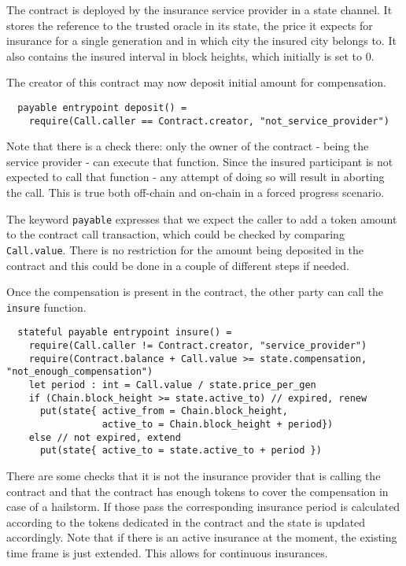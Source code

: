The contract is deployed by the insurance service provider in a state channel.
It stores the reference to the trusted oracle in its state, the price it
expects for insurance for a single generation and in which city the insured
city belongs to. It also contains the insured interval in block heights, which
initially is set to 0.

The creator of this contract may now deposit initial amount for compensation.

\begin{verbatim}
  payable entrypoint deposit() =
    require(Call.caller == Contract.creator, "not_service_provider")
\end{verbatim}

Note that there is a check there: only the owner of the contract - being the
service provider - can execute that function. Since the insured participant is
not expected to call that function - any attempt of doing so will result in
aborting the call. This is true both off-chain and on-chain in a forced
progress scenario.

The keyword \verb+payable+ expresses that we expect the caller to add a token
amount to the contract call transaction, which could be checked by comparing
\verb+Call.value+. There is no restriction for the amount being deposited in
the contract and this could be done in a couple of different steps if needed.

Once the compensation is present in the contract, the other party can
call the \verb+insure+ function.

\begin{verbatim}
  stateful payable entrypoint insure() =
    require(Call.caller != Contract.creator, "service_provider")
    require(Contract.balance + Call.value >= state.compensation, "not_enough_compensation")
    let period : int = Call.value / state.price_per_gen
    if (Chain.block_height >= state.active_to) // expired, renew
      put(state{ active_from = Chain.block_height,
                 active_to = Chain.block_height + period})
    else // not expired, extend
      put(state{ active_to = state.active_to + period })
\end{verbatim}

There are some checks that it is not the insurance provider that is calling
the contract and that the contract has enough tokens to cover the compensation
in case of a hailstorm. If those pass the corresponding insurance period is
calculated according to the tokens dedicated in the contract and the state is
updated accordingly. Note that if there is an active insurance at the moment,
the existing time frame is just extended. This allows for continuous insurances.

